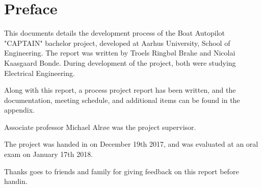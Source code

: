 \chapter{Preface}
This documents details the development process of the Boat Autopilot "CAPTAIN" bachelor project, developed at Aarhus University, School of Engineering. The report was written by Troels Ringbøl Brahe and Nicolai Kaasgaard Bonde. During development of the project, both were studying Electrical Engineering.

Along with this report, a process project report has been written, and the documentation, meeting schedule, and additional items can be found in the appendix.

Associate professor Michael Alrøe was the project supervisor.

The project was handed in on December 19th 2017, and was evaluated at an oral exam on January 17th 2018.

Thanks goes to friends and family for giving feedback on this report before handin.